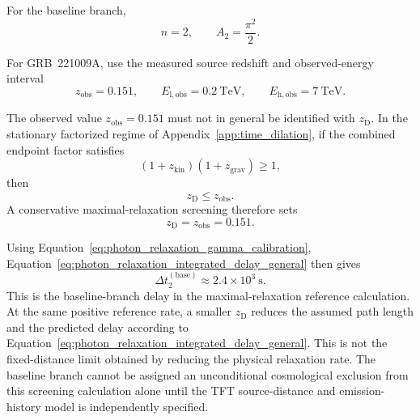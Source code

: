 For the baseline branch,
\begin{equation}
    n
    =
    2,
    \qquad
    A_2
    =
    \frac{
        \pi^2
    }{
        2
    }.
    \label{eq:photon_relaxation_baseline_delay_coefficient}
\end{equation}

For GRB~221009A, use the measured source redshift and observed-energy interval
\begin{equation}
    z_{\mathrm{obs}}
    =
    0.151,
    \qquad
    E_{\mathrm{l,obs}}
    =
    0.2
    \ \mathrm{TeV},
    \qquad
    E_{\mathrm{h,obs}}
    =
    7
    \ \mathrm{TeV}.
    \label{eq:photon_relaxation_lhaaso_screening_inputs}
\end{equation}

The observed value \(z_{\mathrm{obs}}=0.151\) must not in general be identified
with \(z_{\mathrm D}\). In the stationary factorized regime of
Appendix~\ref{app:time_dilation}, if the combined endpoint factor satisfies
\begin{equation}
    (1+z_{\mathrm{kin}})
    (1+z_{\mathrm{grav}})
    \geq
    1,
\end{equation}
then
\begin{equation}
    z_{\mathrm D}
    \leq
    z_{\mathrm{obs}}.
\end{equation}
A conservative maximal-relaxation screening therefore sets
\begin{equation}
    z_{\mathrm D}
    =
    z_{\mathrm{obs}}
    =
    0.151.
\end{equation}

Using Equation~\eqref{eq:photon_relaxation_gamma_calibration},
Equation~\eqref{eq:photon_relaxation_integrated_delay_general} then gives
\begin{equation}
    \Delta t_2^{(\mathrm{base})}
    \approx
    2.4
    \times
    10^3
    \ \mathrm{s}.
    \label{eq:photon_relaxation_baseline_integrated_delay}
\end{equation}
This is the baseline-branch delay in the maximal-relaxation reference
calculation. At the same positive reference rate, a smaller \(z_{\mathrm D}\)
reduces the assumed path length and the predicted delay according to
Equation~\eqref{eq:photon_relaxation_integrated_delay_general}. This is not
the fixed-distance limit obtained by reducing the physical relaxation rate.
The baseline branch cannot be assigned an unconditional cosmological
exclusion from this screening calculation alone until the TFT source-distance
and emission-history model is independently specified.

